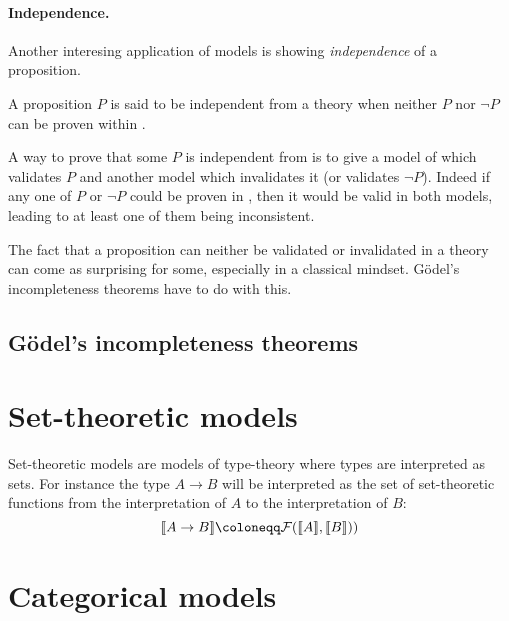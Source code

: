 \paragraph{Independence.}

Another interesing application of models is showing \emph{independence} of a
proposition.

\begin{definition}
  A proposition \(P\) is said to be independent from a theory \cT when neither
  \(P\) nor \(\neg P\) can be proven within \cT.
\end{definition}

A way to prove that some \(P\) is independent from \cT is to give a model of \cT
which validates \(P\) and another model which invalidates it (or validates
\(\neg P\)). Indeed if any one of \(P\) or \(\neg P\) %
could be proven in \cT, then it would be valid in both models, leading to
at least one of them being inconsistent.

The fact that a proposition can neither be validated or invalidated in a theory
can come as surprising for some, especially in a classical mindset.
Gödel's incompleteness theorems have to do with this.

\subsection{Gödel's incompleteness theorems}


\section{Set-theoretic models}

Set-theoretic models are models of type-theory where types are interpreted as
sets. For instance the type \(A \to B\) will be interpreted as the set of
set-theoretic functions from the interpretation of \(A\) to the interpretation
of \(B\):
\[
  \transl{A \to B} \coloneqq \setfun{\transl{A}}{\transl{B}})
\]

\section{Categorical models}

